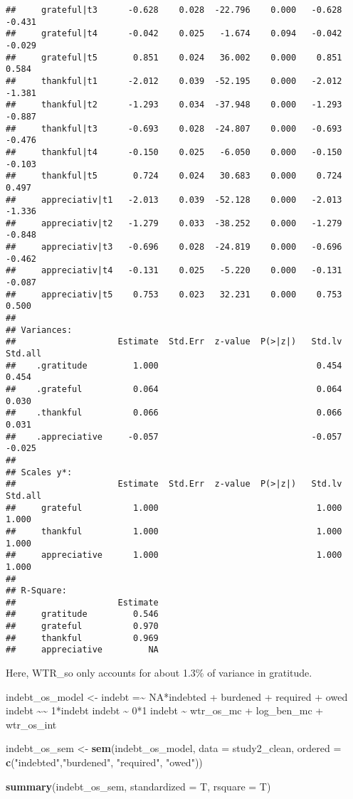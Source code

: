 \documentclass[
]{article}
\newenvironment{Shaded}{\begin{snugshade}}{\end{snugshade}}
\newcommand{\AttributeTok}[1]{\textcolor[rgb]{0.13,0.29,0.53}{#1}}
\newcommand{\FunctionTok}[1]{\textcolor[rgb]{0.13,0.29,0.53}{\textbf{#1}}}
\newcommand{\NormalTok}[1]{#1}
\newcommand{\OtherTok}[1]{\textcolor[rgb]{0.56,0.35,0.01}{#1}}
\newcommand{\StringTok}[1]{\textcolor[rgb]{0.31,0.60,0.02}{#1}}
\begin{document}
\begin{verbatim}
##     grateful|t3      -0.628    0.028  -22.796    0.000   -0.628   -0.431
##     grateful|t4      -0.042    0.025   -1.674    0.094   -0.042   -0.029
##     grateful|t5       0.851    0.024   36.002    0.000    0.851    0.584
##     thankful|t1      -2.012    0.039  -52.195    0.000   -2.012   -1.381
##     thankful|t2      -1.293    0.034  -37.948    0.000   -1.293   -0.887
##     thankful|t3      -0.693    0.028  -24.807    0.000   -0.693   -0.476
##     thankful|t4      -0.150    0.025   -6.050    0.000   -0.150   -0.103
##     thankful|t5       0.724    0.024   30.683    0.000    0.724    0.497
##     appreciativ|t1   -2.013    0.039  -52.128    0.000   -2.013   -1.336
##     appreciativ|t2   -1.279    0.033  -38.252    0.000   -1.279   -0.848
##     appreciativ|t3   -0.696    0.028  -24.819    0.000   -0.696   -0.462
##     appreciativ|t4   -0.131    0.025   -5.220    0.000   -0.131   -0.087
##     appreciativ|t5    0.753    0.023   32.231    0.000    0.753    0.500
## 
## Variances:
##                    Estimate  Std.Err  z-value  P(>|z|)   Std.lv  Std.all
##    .gratitude         1.000                               0.454    0.454
##    .grateful          0.064                               0.064    0.030
##    .thankful          0.066                               0.066    0.031
##    .appreciative     -0.057                              -0.057   -0.025
## 
## Scales y*:
##                    Estimate  Std.Err  z-value  P(>|z|)   Std.lv  Std.all
##     grateful          1.000                               1.000    1.000
##     thankful          1.000                               1.000    1.000
##     appreciative      1.000                               1.000    1.000
## 
## R-Square:
##                    Estimate
##     gratitude         0.546
##     grateful          0.970
##     thankful          0.969
##     appreciative         NA
\end{verbatim}

Here, WTR\_so only accounts for about 1.3\% of variance in gratitude.

\begin{Shaded}
\begin{Highlighting}[]
\NormalTok{indebt\_os\_model }\OtherTok{\textless{}{-}} \StringTok{\textquotesingle{}}
\StringTok{  indebt =\textasciitilde{} NA*indebted + burdened + required + owed}
\StringTok{  indebt \textasciitilde{}\textasciitilde{} 1*indebt}
\StringTok{  indebt \textasciitilde{} 0*1}
\StringTok{  }
\StringTok{  indebt \textasciitilde{} wtr\_os\_mc + log\_ben\_mc + wtr\_os\_int}
\StringTok{\textquotesingle{}}

\NormalTok{indebt\_os\_sem }\OtherTok{\textless{}{-}} \FunctionTok{sem}\NormalTok{(indebt\_os\_model, }\AttributeTok{data =}\NormalTok{ study2\_clean, }\AttributeTok{ordered =} \FunctionTok{c}\NormalTok{(}\StringTok{"indebted"}\NormalTok{,}\StringTok{"burdened"}\NormalTok{, }\StringTok{"required"}\NormalTok{, }\StringTok{"owed"}\NormalTok{))}

\FunctionTok{summary}\NormalTok{(indebt\_os\_sem, }\AttributeTok{standardized =}\NormalTok{ T, }\AttributeTok{rsquare =}\NormalTok{ T)}
\end{Highlighting}
\end{Shaded}
\end{document}
